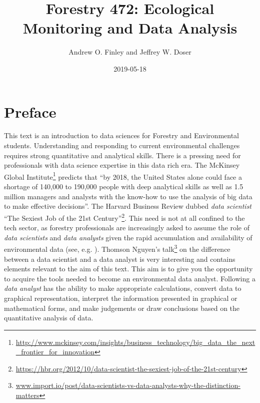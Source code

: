 \documentclass[]{krantz}
\title{Forestry 472: Ecological Monitoring and Data Analysis}
\author{Andrew O. Finley and Jeffrey W. Doser}
\date{2019-05-18}
\renewcommand{\href}[2]{#2\footnote{\url{#1}}}
\begin{document}
\maketitle


\thispagestyle{empty}

\setlength{\abovedisplayskip}{-5pt}
\setlength{\abovedisplayshortskip}{-5pt}

\mainmatter

{
\hypersetup{linkcolor=}
\setcounter{tocdepth}{2}
\tableofcontents
}
\listoftables
\listoffigures
\hypertarget{preface}{%
\chapter*{Preface}\label{preface}}


This text is an introduction to data sciences for Forestry and Environmental students. Understanding and responding to current environmental challenges requires strong quantitative and analytical skills. There is a pressing need for professionals with data science expertise in this data rich era. The \href{http://www.mckinsey.com/insights/business_technology/big_data_the_next_frontier_for_innovation}{McKinsey Global Institute} predicts that ``by 2018, the United States alone could face a shortage of 140,000 to 190,000 people with deep analytical skills as well as 1.5 million managers and analysts with the know-how to use the analysis of big data to make effective decisions''. The Harvard Business Review dubbed \emph{data scientist} \href{https://hbr.org/2012/10/data-scientist-the-sexiest-job-of-the-21st-century}{``The Sexiest Job of the 21st Century''}. This need is not at all confined to the tech sector, as forestry professionals are increasingly asked to assume the role of \emph{data scientists} and \emph{data analysts} given the rapid accumulation and availability of environmental data (see, e.g. \citet{Schimel2015}). \href{www.import.io/post/data-scientists-vs-data-analysts-why-the-distinction-matters}{Thomson Nguyen's talk} on the difference between a data scientist and a data analyst is very interesting and contains elements relevant to the aim of this text. This aim is to give you the opportunity to acquire the tools needed to become an environmental data analyst. Following \citet{Bravo16} a \emph{data analyst} has the ability to make appropriate calculations, convert data to graphical representation, interpret the information presented in graphical or mathematical forms, and make judgements or draw conclusions based on the quantitative analysis of data.
\end{document}
